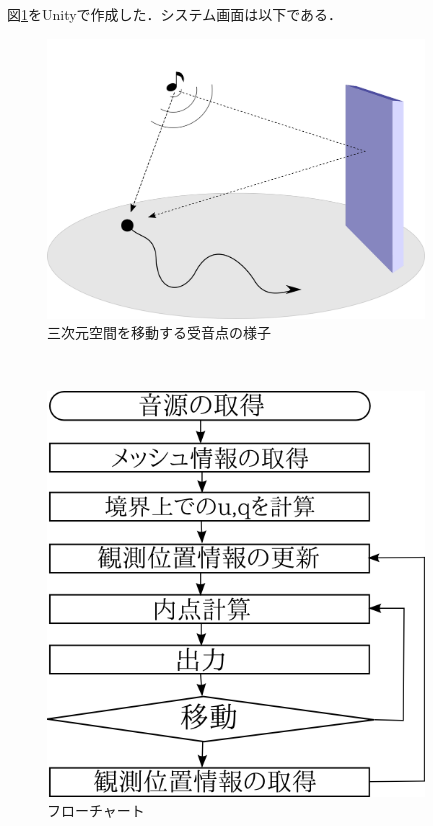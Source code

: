 \documentclass[dvipdfmx]{ampbt}
\begin{document}
図\ref{fig:move_naiten}をUnityで作成した．システム画面は以下である．
\begin{figure}[H]
  \begin{center}
    \includegraphics[clip,width=10.0cm]{./png/move_naiten.png}
    \caption{三次元空間を移動する受音点の様子}
    \label{fig:move_naiten}
  \end{center}
\end{figure}\\




\begin{figure}[H]
  \begin{center}
    \includegraphics[clip,width=10.0cm]{./png/flow.png}
    \caption{フローチャート}
    \label{fig:flow}
  \end{center}
\end{figure}\\
\end{document}
